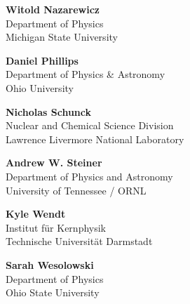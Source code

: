 \begin{minipage}[t]{0.5\linewidth}

\setlength\parskip{\baselineskip}

\textbf{Witold Nazarewicz}\\
Department of Physics\\
Michigan State University

\textbf{Daniel Phillips}\\
Department of Physics \& Astronomy\\
Ohio University

{\bf Nicholas Schunck}\\
Nuclear and Chemical Science Division \\
Lawrence Livermore National Laboratory

{\bf Andrew W. Steiner}\\
Department of Physics and Astronomy\\
University of Tennessee / ORNL

{\bf Kyle Wendt}\\
Institut für Kernphysik\\
Technische Universität Darmstadt

\textbf{Sarah Wesolowski}\\
Department of Physics\\ 
Ohio State University

\end{minipage}

